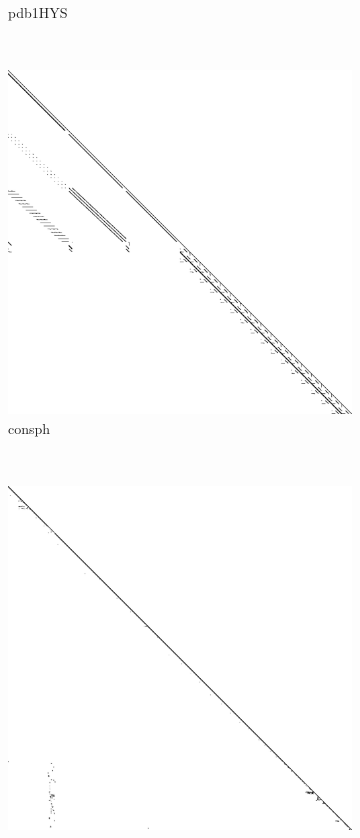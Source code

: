 \begin{figure}
\begin{multicols}{4}
\begin{subfigure}{\linewidth}
\caption{pdb1HYS}
\end{subfigure}~%
\begin{subfigure}{\linewidth}
\includegraphics[width=\linewidth]{images/consph}
\caption{consph}
\end{subfigure}~%
\begin{subfigure}{\linewidth}
\includegraphics[width=\linewidth]{images/pwtk}

\end{subfigure}
\end{multicols}
\end{figure}
